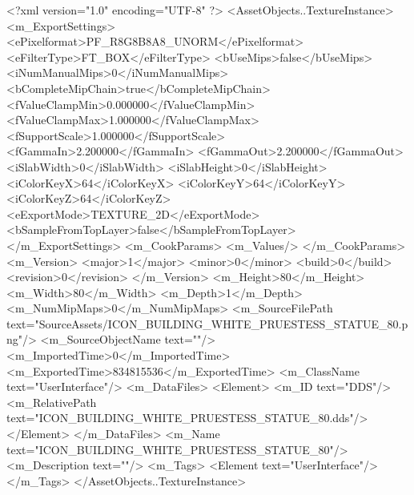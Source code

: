 <?xml version="1.0" encoding="UTF-8" ?>
<AssetObjects..TextureInstance>
	<m_ExportSettings>
		<ePixelformat>PF_R8G8B8A8_UNORM</ePixelformat>
		<eFilterType>FT_BOX</eFilterType>
		<bUseMips>false</bUseMips>
		<iNumManualMips>0</iNumManualMips>
		<bCompleteMipChain>true</bCompleteMipChain>
		<fValueClampMin>0.000000</fValueClampMin>
		<fValueClampMax>1.000000</fValueClampMax>
		<fSupportScale>1.000000</fSupportScale>
		<fGammaIn>2.200000</fGammaIn>
		<fGammaOut>2.200000</fGammaOut>
		<iSlabWidth>0</iSlabWidth>
		<iSlabHeight>0</iSlabHeight>
		<iColorKeyX>64</iColorKeyX>
		<iColorKeyY>64</iColorKeyY>
		<iColorKeyZ>64</iColorKeyZ>
		<eExportMode>TEXTURE_2D</eExportMode>
		<bSampleFromTopLayer>false</bSampleFromTopLayer>
	</m_ExportSettings>
	<m_CookParams>
		<m_Values/>
	</m_CookParams>
	<m_Version>
		<major>1</major>
		<minor>0</minor>
		<build>0</build>
		<revision>0</revision>
	</m_Version>
	<m_Height>80</m_Height>
	<m_Width>80</m_Width>
	<m_Depth>1</m_Depth>
	<m_NumMipMaps>0</m_NumMipMaps>
	<m_SourceFilePath text="SourceAssets/ICON_BUILDING_WHITE_PRUESTESS_STATUE_80.png"/>
	<m_SourceObjectName text=""/>
	<m_ImportedTime>0</m_ImportedTime>
	<m_ExportedTime>834815536</m_ExportedTime>
	<m_ClassName text="UserInterface"/>
	<m_DataFiles>
		<Element>
			<m_ID text="DDS"/>
			<m_RelativePath text="ICON_BUILDING_WHITE_PRUESTESS_STATUE_80.dds"/>
		</Element>
	</m_DataFiles>
	<m_Name text="ICON_BUILDING_WHITE_PRUESTESS_STATUE_80"/>
	<m_Description text=""/>
	<m_Tags>
		<Element text="UserInterface"/>
	</m_Tags>
</AssetObjects..TextureInstance>


